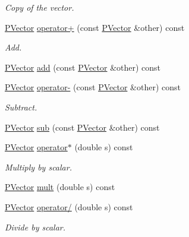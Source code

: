 \begin{DoxyCompactItemize}
\begin{DoxyCompactList}\small\item\em \-Copy of the vector. \end{DoxyCompactList}\item 
\hyperlink{classcprocessing_1_1PVector}{\-P\-Vector} \hyperlink{classcprocessing_1_1PVector_a719ca2d20894e00b176c055f442e9382}{operator+} (const \hyperlink{classcprocessing_1_1PVector}{\-P\-Vector} \&other) const 
\begin{DoxyCompactList}\small\item\em \-Add. \end{DoxyCompactList}\item 
\hyperlink{classcprocessing_1_1PVector}{\-P\-Vector} \hyperlink{classcprocessing_1_1PVector_aea3be0f5e72856a3b65fbff1b7f7d112}{add} (const \hyperlink{classcprocessing_1_1PVector}{\-P\-Vector} \&other) const 
\item 
\hyperlink{classcprocessing_1_1PVector}{\-P\-Vector} \hyperlink{classcprocessing_1_1PVector_a4dd680fdc2225390d711e64d1c14a4d5}{operator-\/} (const \hyperlink{classcprocessing_1_1PVector}{\-P\-Vector} \&other) const 
\begin{DoxyCompactList}\small\item\em \-Subtract. \end{DoxyCompactList}\item 
\hyperlink{classcprocessing_1_1PVector}{\-P\-Vector} \hyperlink{classcprocessing_1_1PVector_ab6777f7d22ac4f70c9e8cc3e34b80ed9}{sub} (const \hyperlink{classcprocessing_1_1PVector}{\-P\-Vector} \&other) const 
\item 
\hyperlink{classcprocessing_1_1PVector}{\-P\-Vector} \hyperlink{classcprocessing_1_1PVector_a365c2898dfe362f4094258eac39f0134}{operator$\ast$} (double s) const 
\begin{DoxyCompactList}\small\item\em \-Multiply by scalar. \end{DoxyCompactList}\item 
\hyperlink{classcprocessing_1_1PVector}{\-P\-Vector} \hyperlink{classcprocessing_1_1PVector_a46d50c68b25c2d61f82533047d165019}{mult} (double s) const 
\item 
\hyperlink{classcprocessing_1_1PVector}{\-P\-Vector} \hyperlink{classcprocessing_1_1PVector_a7dac1f968bd8bb0415d4f78c6e9e2fb5}{operator/} (double s) const 
\begin{DoxyCompactList}\small\item\em \-Divide by scalar. \end{DoxyCompactList}\item 

\end{DoxyCompactItemize}
